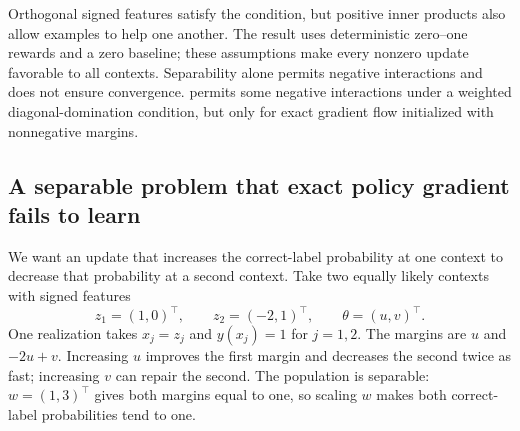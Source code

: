 \documentclass[11pt,twoside]{article}
\theoremstyle{definition}
\theoremstyle{remark}
\begin{document}
Orthogonal signed features satisfy the condition, but positive inner
products also allow examples to help one another. The result uses
deterministic zero--one rewards and a zero baseline; these assumptions
make every nonzero update favorable to all contexts. Separability alone
permits negative interactions and does not ensure convergence.
 permits some negative interactions under a weighted
diagonal-domination condition, but only for exact gradient flow initialized
with nonnegative margins.

\subsection{A separable problem that exact policy gradient fails to learn}

We want an update that increases the correct-label probability at one
context to decrease that probability at a second context. Take two equally
likely contexts with signed features
\begin{equation}
 z_1=(1,0)^\top,\qquad z_2=(-2,1)^\top,
 \qquad \theta=(u,v)^\top.
 \label{eq:two-context-features}
\end{equation}
One realization takes $x_j=z_j$ and $y(x_j)=1$ for $j=1,2$.
The margins are $u$ and $-2u+v$. Increasing $u$ improves the first margin
and decreases the second twice as fast; increasing $v$ can repair the second.
The population is separable: $w=(1,3)^\top$ gives both margins equal
to one, so scaling $w$ makes both correct-label probabilities tend to one.
\end{document}
